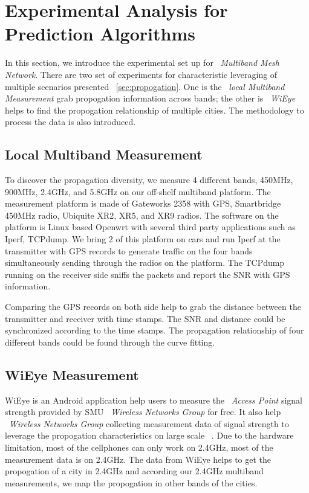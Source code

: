 \section{Experimental Analysis for Prediction Algorithms}
\label{sec:experiment_design}
In this section, we introduce the experimental set up for ~\emph{Multiband Mesh Network}. There are two set of experiments for characteristic leveraging of multiple scenarios presented ~\ref{sec:propogation}. 
One is the ~\emph{local Multiband Measurement} grab propogation information across bands; the other is ~\emph{WiEye} helps to find the propogation relationship of multiple cities. The methodology to process the data is also introduced.

\subsection{Local Multiband Measurement}
To discover the propagation diversity, we measure 4 different bands, 450MHz, 900MHz, 2.4GHz, and 5.8GHz on our off-shelf multiband platform. 
The measurement platform is made of Gateworks 2358 with GPS, Smartbridge 450MHz radio, Ubiquite XR2, XR5, and XR9 radios. 
The software on the platform is Linux based Openwrt with several third party applications such as Iperf, TCPdump.
We bring 2 of this platform on cars and run Iperf at the transmitter with GPS records to generate traffic on the four bands simultaneously sending through the radios on the platform.
The TCPdump running on the receiver side sniffs the packets and report the SNR with GPS information.

Comparing the GPS records on both side help to grab the distance between the transmitter and receiver with time stamps. The SNR and distance could be synchronized according to the time stamps.
The propagation relationship of four different bands could be found through the curve fitting.
\subsection{WiEye Measurement}
WiEye is an Android application help users to measure the ~\emph{Access Point} signal strength provided by SMU ~\emph{Wireless Networks Group} for free. It also help ~\emph{Wireless Networks Group} collecting measurement data of signal strength to leverage the propogation characteristics on large scale ~\cite{meikle2012global}.
Due to the hardware limitation, most of the cellphones can only work on 2.4GHz, most of the measurement data is on 2.4GHz. 
The data from WiEye helps to get the propogation of a city in 2.4GHz and according our 2.4GHz multiband measurements, we map the propogation in other bands of the cities. 

